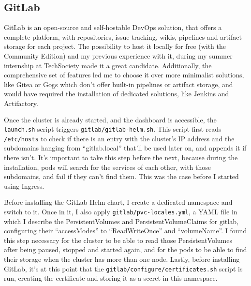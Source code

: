 \documentclass[11pt]{article}
\begin{document}
\begin{flushleft}
 
 
    
    \clearpage
    \subsection{GitLab}
    GitLab is an open-source and self-hostable DevOps solution, that offers a complete platform, with repositories, issue-tracking, wikis, pipelines and artifact storage for each project. The possibility to host it locally for free (with the Community Edition) and my previous experience with it, during my summer internship at TechSociety made it a great candidate. Additionally, the comprehensive set of features led me to choose it over more minimalist solutions, like Gitea or Gogs which don't offer built-in pipelines or artifact storage, and would have required the installation of dedicated solutions, like Jenkins and Artifactory. 
    \linebreak

    Once the cluster is already started, and the dashboard is accessible, the \texttt{launch.sh} script triggers \texttt{gitlab/gitlab-helm.sh}. This script first reads \texttt{/etc/hosts} to check if there is an entry with the cluster's IP address and the subdomains hanging from ``gitlab.local'' that'll be used later on, and appends it if there isn't. It's important to take this step before the next, because during the installation, pods will search for the services of each other, with those subdomains, and fail if they can't find them. This was the case before I started using Ingress.
    \linebreak

    Before installing the GitLab Helm chart, I create a dedicated namespace and switch to it. Once in it, I also apply \texttt{gitlab/pvc-locales.yml}, a YAML file in which I describe the PersistentVolumes and PersistentVolumeClaims for gitlab, configuring their ``accessModes'' to ``ReadWriteOnce'' and ``volumeName''. I found this step necessary for the cluster to be able to read those PersistentVolumes after being paused, stopped and started again, and for the pods to be able to find their storage when the cluster has more than one node. Lastly, before installing GitLab, it's at this point that the \texttt{gitlab/configure/certificates.sh} script is run, creating the certificate and storing it as a secret in this namespace.
    \linebreak


\end{flushleft}
\end{document}
